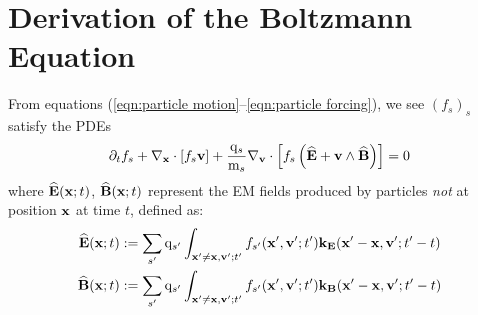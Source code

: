 \section{Derivation of the Boltzmann Equation}\label{cha:Boltzmann equation derivation}
    From equations (\ref{eqn:particle motion}--\ref{eqn:particle forcing}), we see $(f_{s})_{s}$ satisfy the PDEs
    \begin{equation}\label{eqn:exact Boltzmann equation}
        \partial_{t}f_{s} + \nabla_{\mathbf{x}}\cdot[f_{s}\mathbf{v}] + \frac{\mathrm{q}_{s}}{\mathrm{m}_{s}}\nabla_{\mathbf{v}}\cdot\left[f_{s}\left(\widehat{\mathbf{E}} + \mathbf{v}\wedge\widehat{\mathbf{B}}\right)\right]  =  0
    \end{equation}
    where $\widehat{\mathbf{E}}(\mathbf{x}; t)$, $\widehat{\mathbf{B}}(\mathbf{x}; t)$ represent the EM fields produced by particles \emph{not} at position $\mathbf{x}$ at time $t$, defined as:
    \begin{align}
        \widehat{\mathbf{E}}(\mathbf{x}; t)  &:=  \sum_{s'}\mathrm{q}_{s'}\int_{\mathbf{x}' \neq \mathbf{x}, \mathbf{v}'; t'}f_{s'}(\mathbf{x}', \mathbf{v}'; t')\mathbf{k}_{\mathbf{E}}(\mathbf{x}' - \mathbf{x}, \mathbf{v}'; t' - t)  \\
        \widehat{\mathbf{B}}(\mathbf{x}; t)  &:=  \sum_{s'}\mathrm{q}_{s'}\int_{\mathbf{x}' \neq \mathbf{x}, \mathbf{v}'; t'}f_{s'}(\mathbf{x}', \mathbf{v}'; t')\mathbf{k}_{\mathbf{B}}(\mathbf{x}' - \mathbf{x}, \mathbf{v}'; t' - t)
    \end{align}

